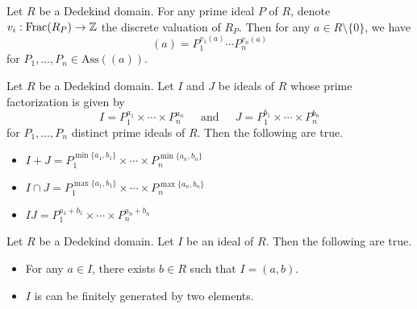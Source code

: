 \documentclass[a4paper]{article}
\begin{document}
\begin{prp}{}{} Let $R$ be a Dedekind domain. For any prime ideal $P$ of $R$, denote $v_i:\text{Frac}(R_P)\to\mathbb{Z}$ the discrete valuation of $R_P$. Then for any $a\in R\setminus\{0\}$, we have $$(a)=P_1^{v_1(a)}\cdots P_n^{v_n(a)}$$ for $P_1,\dots,P_n\in\text{Ass}((a))$. 
\end{prp}

\begin{prp}{}{} Let $R$ be a Dedekind domain. Let $I$ and $J$ be ideals of $R$ whose prime factorization is given by $$I=P_1^{a_1}\times\cdots\times P_n^{a_n}\;\;\;\;\text{ and }\;\;\;\;J=P_1^{b_1}\times\cdots\times P_n^{b_n}$$ for $P_1,\dots,P_n$ distinct prime ideals of $R$. Then the following are true. 
\begin{itemize}
\item $I+J=P_1^{\min\{a_1,b_1\}}\times\cdots\times P_n^{\min\{a_n,b_n\}}$
\item $I\cap J=P_1^{\max\{a_1,b_1\}}\times\cdots\times P_n^{\max\{a_n,b_n\}}$
\item $IJ=P_1^{a_1+b_1}\times\cdots\times P_n^{a_n+b_n}$
\end{itemize}
\end{prp}

\begin{prp}{}{} Let $R$ be a Dedekind domain. Let $I$ be an ideal of $R$. Then the following are true. 
\begin{itemize}
\item For any $a\in I$, there exists $b\in R$ such that $I=(a,b)$. 
\item $I$ is can be finitely generated by two elements. 
\end{itemize}
\end{prp}
\end{document}
